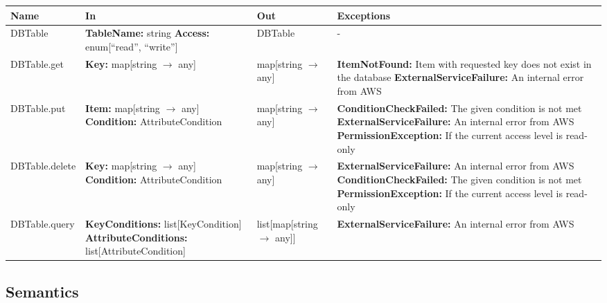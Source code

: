 \documentclass[12pt, titlepage]{article}
\begin{document}
\begin{center}
  \begin{tabular}{>{\raggedright}p{3cm} >{\raggedright}p{5cm}
    >{\raggedright}p{3cm} p{4cm}}
    \hline
    \textbf{Name} & \textbf{In} & \textbf{Out} & \textbf{Exceptions} \\
    \hline
    DBTable & \textbf{TableName:} string \newline \textbf{Access:}
    enum[``read'', ``write''] & DBTable & - \\
    \hline
    DBTable.get & \textbf{Key:} map[string $\rightarrow$ any] &
    map[string $\rightarrow$ any] & \textbf{ItemNotFound:} Item with
    requested key does not exist in the database \newline
    \textbf{ExternalServiceFailure:} An internal error from AWS \\
    \hline
    DBTable.put & \textbf{Item:} map[string $\rightarrow$ any]
    \newline \textbf{Condition:} AttributeCondition & map[string
    $\rightarrow$ any] &
    \textbf{ConditionCheckFailed:} The given condition is not met
    \newline \textbf{ExternalServiceFailure:} An internal error from
    AWS \newline \textbf{PermissionException:} If the current access
    level is read-only \\
    \hline
    DBTable.delete & \textbf{Key:} map[string $\rightarrow$ any]
    \newline \textbf{Condition:} AttributeCondition & map[string
    $\rightarrow$ any] & \textbf{ExternalServiceFailure:} An internal
    error from AWS \newline \textbf{ConditionCheckFailed:} The given
    condition is not met \newline \textbf{PermissionException:} If
    the current access level is read-only \\
    \hline
    DBTable.query & \textbf{KeyConditions:} list[KeyCondition]
    \newline \textbf{AttributeConditions:} list[AttributeCondition] &
    list[map[string $\rightarrow$ any]] &
    \textbf{ExternalServiceFailure:} An internal error from AWS \\
    \hline
  \end{tabular}
\end{center}

\subsection{Semantics}
\end{document}
